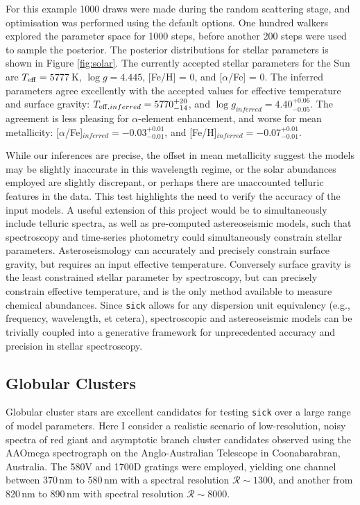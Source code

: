 \documentclass[iop]{emulateapj}
\newcommand{\sick}{\texttt{sick}}
\begin{document}
For this example 1000 draws were made during the random scattering stage, and 
optimisation was performed using the default options. One hundred walkers 
explored the parameter space for 1000 steps, before another 200 steps were used 
to sample the posterior. The posterior distributions for stellar parameters is 
shown in Figure \ref{fig:solar}. The currently accepted stellar parameters for 
the Sun are $T_{\rm eff} = 5777$\,K, $\log{g} = 4.445$, [Fe/H] = 0, and 
[$\alpha$/Fe] = 0. The inferred parameters agree excellently with the accepted 
values for effective temperature and surface gravity: 
$T_{{\rm eff},inferred} = 5770^{+20}_{-14}$, and $\log{g}_{inferred} = 4.40^{+0.06}_{-0.05}$. 
The agreement is less pleasing for $\alpha$-element enhancement, and worse for 
mean metallicity: [$\alpha$/Fe]$_{inferred} = -0.03^{+0.01}_{-0.01}$, and 
[Fe/H]$_{inferred} = -0.07^{+0.01}_{-0.01}$. 

While our inferences are precise, the offset in mean metallicity suggest the 
models may be slightly inaccurate in this wavelength regime, or the solar abundances
employed are slightly discrepant, or perhaps there are 
unaccounted telluric features in the data. This test highlights the need to 
verify the accuracy of the input models. A useful extension of this project 
would be to simultaneously include telluric spectra, as well as pre-computed 
astereoseismic models, such that spectroscopy and time-series photometry could 
simultaneously constrain stellar parameters. Asteroseismology can accurately and 
precisely constrain surface gravity, but requires an input effective temperature. 
Conversely surface gravity is the least constrained stellar parameter by spectroscopy, 
but can precisely constrain effective temperature, and is the only method available 
to measure chemical abundances. Since \sick{} allows for any dispersion unit 
equivalency (e.g., frequency, wavelength, et cetera), spectroscopic and astereoseismic 
models can be trivially coupled into a generative framework for unprecedented 
accuracy and precision in stellar spectroscopy.

\subsection{Globular Clusters}
Globular cluster stars are excellent candidates for testing \sick{} over a large 
range of model parameters. Here I consider a realistic scenario of 
low-resolution, noisy spectra of red giant and asymptotic branch cluster 
candidates observed using the AAOmega spectrograph on the Anglo-Australian 
Telescope in Coonabarabran, Australia. The 580V and 1700D gratings were employed, 
yielding one channel between 370\,nm to 580\,nm with a spectral resolution 
$\mathcal{R} \sim 1300$, and another from 820\,nm to 890\,nm with spectral 
resolution $\mathcal{R} \sim 8000$.
\end{document}
